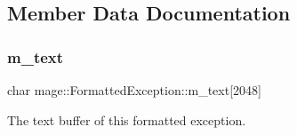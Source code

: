 \subsection{Member Data Documentation}
\hypertarget{structmage_1_1_formatted_exception_aadccdcc1db09285dadc6b5a30681e05b}{}\label{structmage_1_1_formatted_exception_aadccdcc1db09285dadc6b5a30681e05b} 
\subsubsection{\texorpdfstring{m\+\_\+text}{m\_text}}
{\footnotesize\ttfamily char mage\+::\+Formatted\+Exception\+::m\+\_\+text\mbox{[}2048\mbox{]}\hspace{0.3cm}{\ttfamily [private]}}

The text buffer of this formatted exception. 